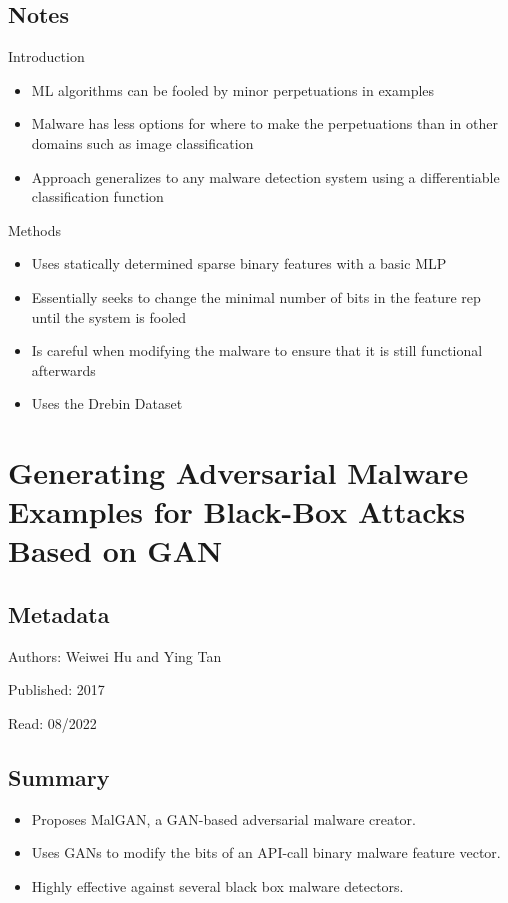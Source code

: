 \documentclass{article}
\begin{document}
\subsection*{Notes}

Introduction
\begin{itemize}
\item ML algorithms can be fooled by minor perpetuations in examples
\item Malware has less options for where to make the perpetuations than in other domains such as image classification
\item Approach generalizes to any malware detection system using a differentiable classification function
\end{itemize}
Methods
\begin{itemize}
\item Uses statically determined sparse binary features with a basic MLP
\item Essentially seeks to change the minimal number of bits in the feature rep until the system is fooled
\item Is careful when modifying the malware to ensure that it is still functional afterwards
\item Uses the Drebin Dataset
\end{itemize}

\pagebreak


\section*{Generating Adversarial Malware Examples for Black-Box Attacks Based on GAN}

\subsection*{Metadata}

\noindent Authors: Weiwei Hu and Ying Tan

\noindent Published: 2017

\noindent Read: 08/2022

\subsection*{Summary}
\begin{itemize}
\item Proposes MalGAN, a GAN-based adversarial malware creator.
\item Uses GANs to modify the bits of an API-call binary malware feature vector.
\item Highly effective against several black box malware detectors.
\end{itemize}
\end{document}
